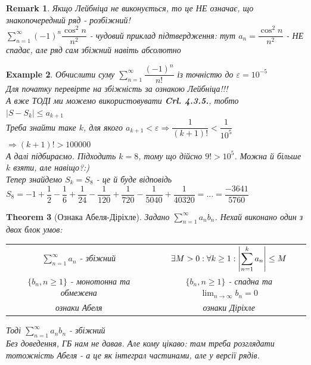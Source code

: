 \documentclass[a4paper, 14pt]{extarticle}
\def\huge{\displaystyle}
\theoremstyle{theoremdd}
\newtheorem{theorem}{Theorem}[subsection]
\theoremstyle{theoremdd}
\theoremstyle{theoremdd}
\theoremstyle{theoremdd}
\newtheorem{example}[theorem]{Example}
\theoremstyle{theoremdd}
\theoremstyle{theoremdd}
\newtheorem{remark}[theorem]{Remark}
\theoremstyle{theoremdd}
\theoremstyle{theoremdd}
\begin{document}
\begin{remark}
Якщо Лейбніца не виконується, то це НЕ означає, що знакопочередний ряд - розбіжний!\\
$\huge\sum_{n=1}^\infty (-1)^n \dfrac{\cos^2 n}{n^2}$ - чудовий приклад підтвердження: тут $a_n = \dfrac{\cos^2 n}{n^2}$ - НЕ спадає, але ряд сам збіжний навіть абсолютно\\
\end{remark}

\begin{example}
Обчислити суму $\huge\sum_{n=1}^\infty \dfrac{(-1)^n}{n!}$ із точністю до $\varepsilon = 10^{-5}$\\
Для початку \textit{перевірте на збіжність за ознакою Лейбніца!!!}\\
А вже ТОДІ ми можемо використовувати \textbf{Crl. 4.3.5.}, тобто\\
$|S - S_k| \leq a_{k+1}$\\
Треба знайти таке $k$, для якого $a_{k+1} < \varepsilon \Rightarrow \dfrac{1}{(k+1)!} < \dfrac{1}{10^5}$\\
$\Rightarrow (k+1)! > 100000$\\
А далі підбираємо. Підходить $k = 8$, тому що дійсно $9! > 10^5$. Можна й більше $k$ взяти, але навіщо?:)\\
Тепер знайдемо $S_k = S_8$ - це й буде відповідь\\
$S_8 = -1 + \dfrac{1}{2} - \dfrac{1}{6} + \dfrac{1}{24} - \dfrac{1}{120} + \dfrac{1}{720} - \dfrac{1}{5040} + \dfrac{1}{40320} = \dots = \dfrac{-3641}{5760}$
\\
\end{example}

\begin{theorem}[Ознака Абеля-Діріхле]
Задано $\huge \sum_{n=1}^{\infty} a_n b_n$. Нехай виконано один з двох блок умов:\\
\begin{tabular}{c | c}
$\huge \sum_{n=1}^{\infty} a_n$ - збіжний & $\exists M > 0: \forall k \geq 1: \huge \abs{\sum_{n=1}^k a_n} \leq M$ \\
$\{b_n, n \geq 1\}$ - монотонна та обмежена & $\{b_n, n \geq 1\}$ - спадна та $\huge \lim_{n \to \infty} b_n = 0$ \\
\textit{ознаки Абеля} & \textit{ознаки Діріхле}
\end{tabular}
Тоді $\huge \sum_{n=1}^{\infty} a_n b_n$ - збіжний\\
\textit{Без доведення, ГБ нам не давав. Але кому цікаво: там треба розглядати тотожність Абеля - а це як інтеграл частинами, але у версії рядів.}
\end{theorem}
\end{document}
